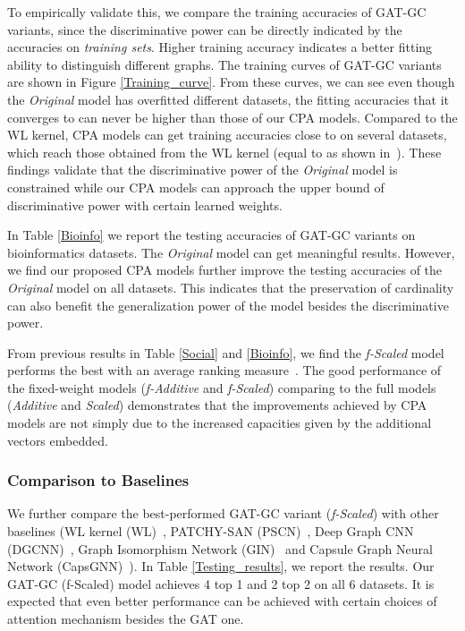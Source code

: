 \documentclass[letterpaper]{article} \usepackage{aaai20}  \usepackage{times}  \usepackage{helvet} \usepackage{courier}  \usepackage[hyphens]{url}  \usepackage{graphicx} \urlstyle{rm} \def\UrlFont{\rm}  \usepackage{graphicx}  \frenchspacing  \setlength{\pdfpagewidth}{8.5in}  \setlength{\pdfpageheight}{11in}
\theoremstyle{plain}
\theoremstyle{definition}
\begin{document}
To empirically validate this, we compare the training accuracies of GAT-GC variants, since the discriminative power can be directly indicated by the accuracies on {\em training sets}. Higher training accuracy indicates a better fitting ability to distinguish different graphs. The training curves of GAT-GC variants are shown in Figure \ref{Training_curve}. From these curves, we can see even though the \textit{Original} model has overfitted different datasets, the fitting accuracies that it converges to can never be higher than those of our CPA models. Compared to the WL kernel, CPA models can get training accuracies close to  on several datasets, which reach those obtained from the WL kernel (equal to  as shown in~\cite{xu2018how}). These findings validate that the discriminative power of the \textit{Original} model is constrained while our CPA models can approach the upper bound of discriminative power with certain learned weights.

In Table \ref{Bioinfo} we report the testing accuracies of GAT-GC variants on bioinformatics datasets. The \textit{Original} model can get meaningful results. However, we find our proposed CPA models further improve the testing accuracies of the \textit{Original} model on all datasets. This indicates that the preservation of cardinality can also benefit the generalization power of the model besides the discriminative power.

From previous results in Table \ref{Social} and \ref{Bioinfo}, we find the \textit{f-Scaled} model performs the best with an average ranking measure~\cite{taheri2018learning}. The good performance of the fixed-weight models (\textit{f-Additive} and \textit{f-Scaled}) comparing to the full models (\textit{Additive} and \textit{Scaled}) demonstrates that the improvements achieved by CPA models are not simply due to the increased capacities given by the additional vectors embedded.

\subsubsection{Comparison to Baselines}
We further compare the best-performed GAT-GC variant (\textit{f-Scaled}) with other baselines (WL kernel (WL)~\cite{shervashidze2011weisfeiler}, PATCHY-SAN (PSCN)~\cite{niepert2016learning}, Deep Graph CNN (DGCNN)~\cite{zhang2018end}, Graph Isomorphism Network (GIN)~\cite{xu2018how} and Capsule Graph Neural Network (CapsGNN)~\cite{xinyi2019capsule}). In Table \ref{Testing_results}, we report the results. Our GAT-GC (f-Scaled) model achieves 4 top 1 and 2 top 2 on all 6 datasets. It is expected that even better performance can be achieved with certain choices of attention mechanism besides the GAT one.
\end{document}
